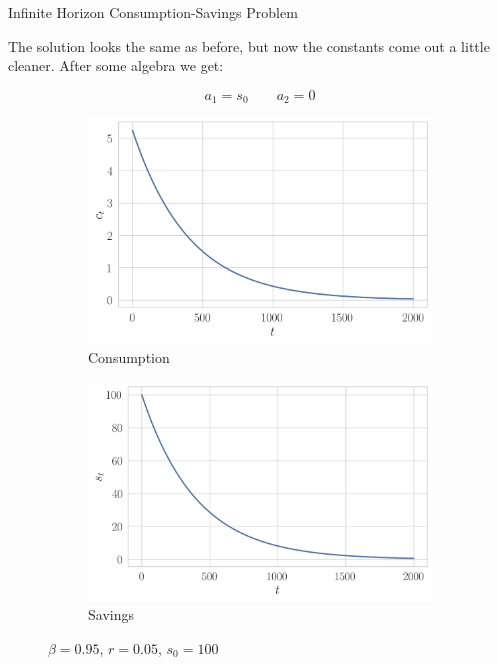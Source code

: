 \documentclass[11pt, xcolor={dvipsnames}, hyperref={colorlinks, allcolors=Blue}]{beamer}
\begin{document}
\begin{frame}{Infinite Horizon Consumption-Savings Problem}

The solution looks the same as before, but now the constants come out a little cleaner. After some algebra we get:

\[ a_{1} = s_{0} \qquad a_{2}= 0\]

\begin{figure}
	\begin{subfigure}[b]{0.45\textwidth}
		\centering
		\includegraphics[width=\textwidth]{IH_consumption.png}	
		\caption{Consumption}
	\end{subfigure}
	\begin{subfigure}[b]{0.45\textwidth}
		\centering
		\includegraphics[width=\textwidth]{IH_savings.png}
		\caption{Savings}
	\end{subfigure}
\caption*{$\beta=0.95$, $r=0.05$, $s_{0}=100$}
\end{figure}

\end{frame}
\end{document}
